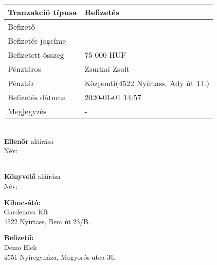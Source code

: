 \documentclass{article}
\begin{document}
\noindent\makebox[6.45in]{\rule{\paperwidth}{0.4pt}}


\rule[2\baselineskip]{0pt}{0pt}

\begin{minipage}[t]{0.45\textwidth}
  \renewcommand{\arraystretch}{1.5}
  \begin{tabular}{ |p{3cm}|p{4cm}| }
    \hline
    Tranzakció típusa & Befizetés                                         \\
    \hline
    Befizető          & -                                                 \\
    \hline
    Befizetés jogcíme & -                                                 \\
    \hline
    Befizetett összeg & 75 000 HUF                                        \\
    \hline
    Pénztáros         & Zsurkai Zsolt                                     \\
    \hline
    Pénztár           & Központi\footnotemark (4522 Nyírtass, Ady út 11.) \\
    \hline
    Befizetés dátuma  & 2020-01-01 14:57                                  \\
    \hline
    Megjegyzés        & -                                                 \\
    \hline
  \end{tabular}
\end{minipage}
\hfill
\begin{minipage}[t]{0.45\textwidth}
  \makebox[2.5in]{\hrulefill} \\
  {\bf Ellenőr} aláírása \\
  Név:

  \bigskip
  \makebox[2.5in]{\hrulefill} \\
  {\bf Könyvelő} aláírása\\
  Név:
\end{minipage}

\newpage

\rule[2\baselineskip]{0pt}{0pt}%
\begin{minipage}[t]{0.45\textwidth}
  \textbf {Kibocsátó:}\\
  Gardenova Kft\\
  4522 Nyírtass, Bem út 23/B.
\end{minipage}
\hfill
\begin{minipage}[t]{0.45\textwidth}
  \textbf {Befizető:}\\
  Demo Elek\\
  4551 Nyíregyháza, Mogyorós utca 36.
\end{minipage}
\end{document}
